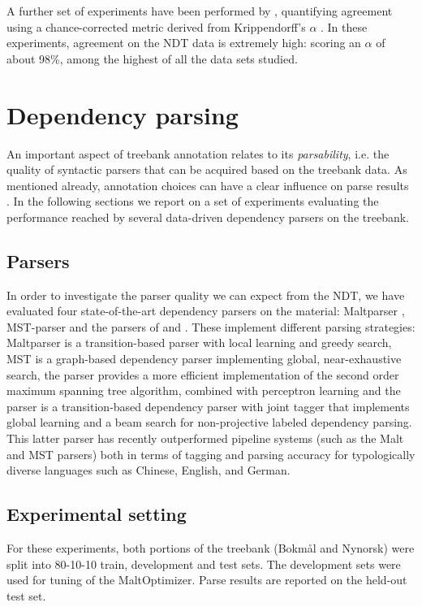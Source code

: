 \documentclass[10pt,a4paper]{article}
\begin{document}
A further set of experiments have been performed by ,
quantifying agreement using a chance-corrected metric derived from
Krippendorff's $\alpha$ \cite{Krippendorff:12}. In these experiments,
agreement on the NDT data is extremely high: scoring an $\alpha$ of about
98\%, among the highest of all the data sets studied.

\section{Dependency parsing}
An important aspect of treebank annotation relates to its
\emph{parsability}, i.e. the quality of syntactic parsers that can be
acquired based on the treebank data. As mentioned already, annotation
choices can have a clear influence on parse results
\cite{Sch:Abe:Rap:12}. In the following sections we report on a set of experiments evaluating the performance reached by several data-driven dependency parsers on the treebank.
 
\subsection{Parsers}
In order to investigate the parser quality we
can expect from the NDT, we have evaluated four state-of-the-art
dependency parsers on the material: Maltparser \cite{Niv:Hal:Nil:06},
MST-parser \cite{McD:Per:Rib:Haj:05} and the parsers of
 and . These implement different
parsing strategies: Maltparser is a transition-based parser with local
learning and greedy search, MST is a graph-based dependency parser
implementing global, near-exhaustive search, the 
parser provides a more efficient implementation of the second order
maximum spanning tree algorithm, combined with perceptron learning and
the  parser is a transition-based dependency
parser with joint tagger that implements global learning and a beam
search for non-projective labeled dependency parsing.  This latter
parser has recently outperformed pipeline systems (such as the Malt
and MST parsers) both in terms of tagging and parsing accuracy for
typologically diverse languages such as Chinese, English, and German.

\subsection{Experimental setting}
For these experiments, both portions of the treebank (Bokm{\aa}l and
Nynorsk) were split into 80-10-10 train, development and test sets. The development sets were used for tuning of the MaltOptimizer. Parse results are reported on the held-out test set.
\end{document}
